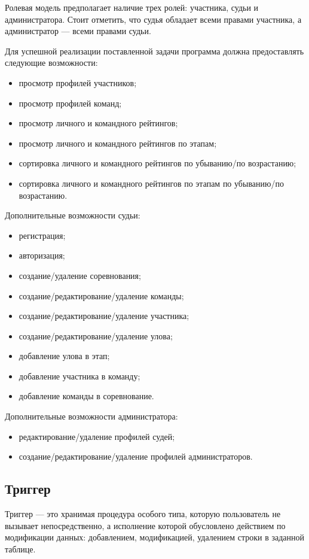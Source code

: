 Ролевая модель предполагает наличие трех ролей: участника, судьи и администратора. Стоит отметить, что судья обладает всеми правами участника, а администратор --- всеми правами судьи.

Для успешной реализации поставленной задачи программа должна предоставлять следующие возможности:
\begin{itemize}[label=---]
	\item просмотр профилей участников;
	\item просмотр профилей команд;
	\item просмотр личного и командного рейтингов;
	\item просмотр личного и командного рейтингов по этапам;
	\item сортировка личного и командного рейтингов по убыванию/по возрастанию;
	\item сортировка личного и командного рейтингов по этапам по убыванию/по возрастанию.
\end{itemize}

Дополнительные возможности судьи:
\begin{itemize}[label=---]
	\item регистрация;
	\item авторизация;
	\item создание/удаление соревнования;
	\item создание/редактирование/удаление команды;
	\item создание/редактирование/удаление участника;
	\item создание/редактирование/удаление улова;
	\item добавление улова в этап;
	\item добавление участника в команду;
	\item добавление команды в соревнование.
\end{itemize}

Дополнительные возможности администратора:
\begin{itemize}[label=---]
	\item редактирование/удаление профилей судей;
	\item создание/редактирование/удаление профилей администраторов.
\end{itemize}

\subsection{Триггер}
Триггер --- это хранимая процедура особого типа, которую пользователь не вызывает непосредственно, а исполнение которой обусловлено действием по модификации данных: добавлением, модификацией, удалением строки в заданной таблице.  
 
